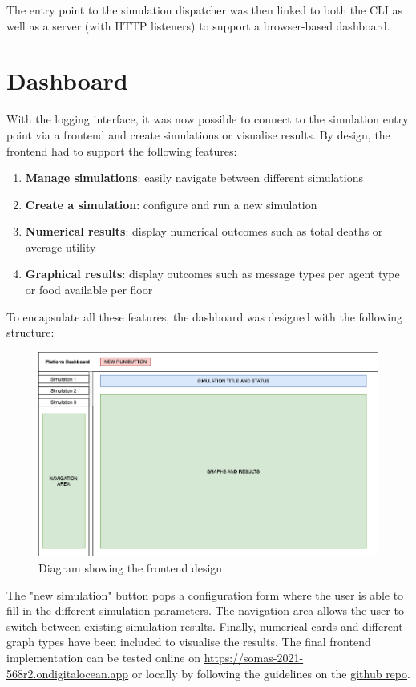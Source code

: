 The entry point to the simulation dispatcher was then linked to both the CLI as well as a server (with HTTP listeners) to support a browser-based dashboard.

\section{Dashboard}

With the logging interface, it was now possible to connect to the simulation entry point via a frontend and create simulations or visualise results. By design, the frontend had to support the following features:

\begin{enumerate}
    \item \textbf{Manage simulations}: easily navigate between different simulations
    \item \textbf{Create a simulation}: configure and run a new simulation
    \item \textbf{Numerical results}: display numerical outcomes such as total deaths or average utility
    \item \textbf{Graphical results}: display outcomes such as message types per agent type or food available per floor
\end{enumerate}

To encapsulate all these features, the dashboard was designed with the following structure:

\begin{figure}[htb]
    \centering
    \includegraphics[width=\linewidth]{003_data_logging/images/design.png}
    \caption{Diagram showing the frontend design}
    \label{fig:design_ui}
\end{figure}

The "new simulation" button pops a configuration form where the user is able to fill in the different simulation parameters. The navigation area allows the user to switch between existing simulation results. Finally, numerical cards and different graph types have been included to visualise the results. The final frontend implementation can be tested online on \href{https://somas-2021-568r2.ondigitalocean.app}{https://somas-2021-568r2.ondigitalocean.app} or locally by following the guidelines on the \href{https://github.com/SOMAS2021/SOMAS2021#building-locally}{github repo}.